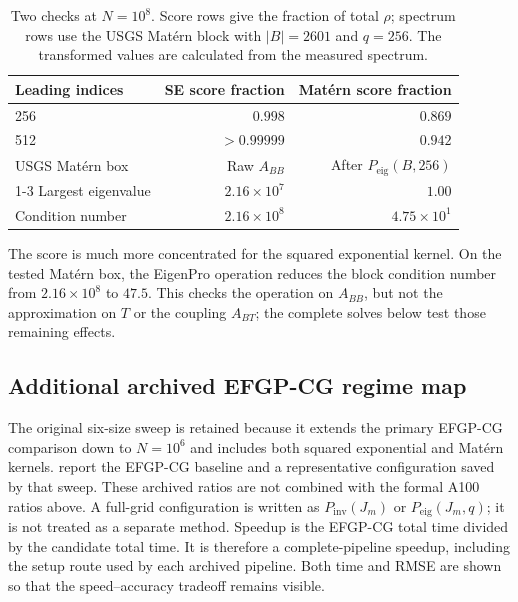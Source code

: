 \begin{table}[H]
\centering
\small
\caption{Two checks at \(N=10^8\). Score rows give the fraction of total
\(\rho\); spectrum rows use the USGS Mat\'ern block with \(|B|=2601\) and
\(q=256\). The transformed values are calculated from the measured spectrum.}
\label{tab:mechanism-check}
\begin{tabular}{lrr}
\toprule
Leading indices & SE score fraction & Mat\'ern score fraction \\
\midrule
256 & \(0.998\) & \(0.869\) \\
512 & \({>}0.99999\) & \(0.942\) \\
\addlinespace[2pt]
USGS Mat\'ern box & Raw \(A_{BB}\) & After \(P_{\mathrm{eig}}(B,256)\) \\
\cmidrule(lr){1-3}
Largest eigenvalue & \(2.16\times10^7\) & \(1.00\) \\
Condition number & \(2.16\times10^8\) & \(4.75\times10^1\) \\
\bottomrule
\end{tabular}
\end{table}

The score is much more concentrated for the squared exponential kernel. On
the tested Mat\'ern box, the EigenPro operation reduces the block condition
number from \(2.16\times10^8\) to \(47.5\). This checks the operation on
\(A_{BB}\), but not the approximation on \(T\) or the coupling \(A_{BT}\);
the complete solves below test those remaining effects.

\subsection{Additional archived EFGP-CG regime map}
\label{subsec:exp-scalability}

The original six-size sweep is retained because it extends the primary
EFGP-CG comparison down to \(N=10^6\) and includes both squared exponential
and Mat\'ern kernels.   report
the EFGP-CG baseline and a representative configuration saved by that sweep.
These archived ratios are not combined with the formal A100 ratios above.  A
full-grid configuration is written as
\(P_{\mathrm{inv}}(J_m)\) or \(P_{\mathrm{eig}}(J_m,q)\); it is not treated
as a separate method. Speedup is the EFGP-CG total time divided by the
candidate total time. It is therefore a complete-pipeline speedup, including
the setup route used by each archived pipeline.  Both time and RMSE are shown
so that the speed--accuracy tradeoff remains visible.


